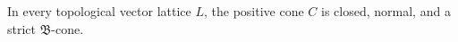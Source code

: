 In every topological vector lattice $L$, the positive cone $C$ is closed, normal, and a strict $\mathfrak{B}$-cone.

